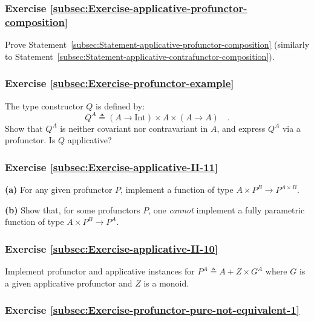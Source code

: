 \subsubsection{Exercise \label{subsec:Exercise-applicative-profunctor-composition}\ref{subsec:Exercise-applicative-profunctor-composition}}

Prove Statement~\ref{subsec:Statement-applicative-profunctor-composition}
(similarly to Statement~\ref{subsec:Statement-applicative-contrafunctor-composition}).

\subsubsection{Exercise \label{subsec:Exercise-profunctor-example}\ref{subsec:Exercise-profunctor-example}}

The type constructor $Q$ is defined by: 
\[
Q^{A}\triangleq\left(A\rightarrow\text{Int}\right)\times A\times\left(A\rightarrow A\right)\quad.
\]
Show that $Q^{A}$ is neither covariant nor contravariant in $A$,
and express $Q^{A}$ via a profunctor. Is $Q$ applicative?

\subsubsection{Exercise \label{subsec:Exercise-applicative-II-11}\ref{subsec:Exercise-applicative-II-11}}

\textbf{(a)} For any given profunctor $P$, implement a function of
type $A\times P^{B}\rightarrow P^{A\times B}$. 

\textbf{(b)} Show that, for some profunctors $P$, one \emph{cannot}
implement a fully parametric function of type $A\times P^{B}\rightarrow P^{A}$.

\subsubsection{Exercise \label{subsec:Exercise-applicative-II-10}\ref{subsec:Exercise-applicative-II-10}}

Implement profunctor and applicative instances for $P^{A}\triangleq A+Z\times G^{A}$
where $G$ is a given applicative profunctor and $Z$ is a monoid.

\subsubsection{Exercise \label{subsec:Exercise-profunctor-pure-not-equivalent-1}\ref{subsec:Exercise-profunctor-pure-not-equivalent-1}}

